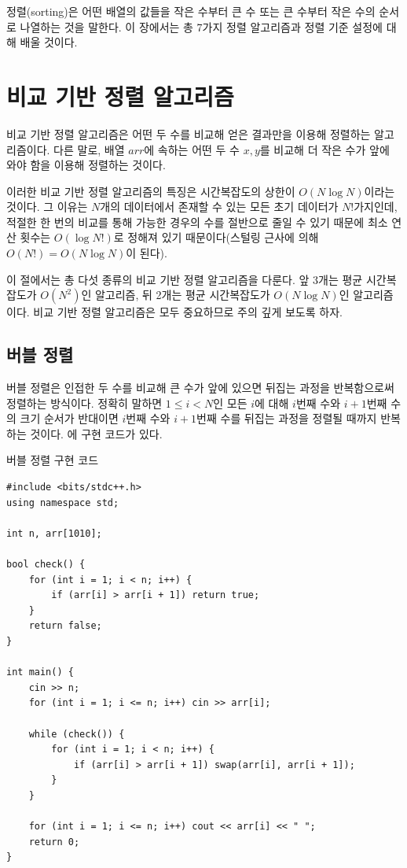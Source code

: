 정렬(sorting)은 어떤 배열의 값들을 작은 수부터 큰 수 또는 큰 수부터 작은 수의 순서로 나열하는 것을 말한다. 이 장에서는 총 7가지 정렬 알고리즘과 정렬 기준 설정에 대해 배울 것이다.

\section{비교 기반 정렬 알고리즘}
비교 기반 정렬 알고리즘은 어떤 두 수를 비교해 얻은 결과만을 이용해 정렬하는 알고리즘이다. 다른 말로, 배열 $arr$에 속하는 어떤 두 수 $x, y$를 비교해 더 작은 수가 앞에 와야 함을 이용해 정렬하는 것이다.

이러한 비교 기반 정렬 알고리즘의 특징은 시간복잡도의 상한이 $O(N \log N)$이라는 것이다. 그 이유는 $N$개의 데이터에서 존재할 수 있는 모든 초기 데이터가 $N!$가지인데, 적절한 한 번의 비교를 통해 가능한 경우의 수를 절반으로 줄일 수 있기 때문에 최소 연산 횟수는 $O(\log N!)$로 정해져 있기 때문이다(스털링 근사에 의해 $O(N!)=O(N \log N)$이 된다). 

이 절에서는 총 다섯 종류의 비교 기반 정렬 알고리즘을 다룬다. 앞 3개는 평균 시간복잡도가 $O(N^2)$인 알고리즘, 뒤 2개는 평균 시간복잡도가 $O(N \log N)$인 알고리즘이다. 비교 기반 정렬 알고리즘은 모두 중요하므로 주의 깊게 보도록 하자.

\subsection{버블 정렬}
버블 정렬은 인접한 두 수를 비교해 큰 수가 앞에 있으면 뒤집는 과정을 반복함으로써 정렬하는 방식이다. 정확히 말하면 $1 \leq i < N$인 모든 $i$에 대해 $i$번째 수와 $i+1$번째 수의 크기 순서가 반대이면 $i$번째 수와 $i+1$번째 수를 뒤집는 과정을 정렬될 때까지 반복하는 것이다. 에 구현 코드가 있다.

\begin{code} \label{code: bubble}
버블 정렬 구현 코드
\begin{lstlisting}
#include <bits/stdc++.h>
using namespace std;

int n, arr[1010];

bool check() {
    for (int i = 1; i < n; i++) {
        if (arr[i] > arr[i + 1]) return true;
    }
    return false;
}

int main() {
    cin >> n;
    for (int i = 1; i <= n; i++) cin >> arr[i];

    while (check()) {
        for (int i = 1; i < n; i++) {
            if (arr[i] > arr[i + 1]) swap(arr[i], arr[i + 1]);
        }
    }

    for (int i = 1; i <= n; i++) cout << arr[i] << " ";
    return 0;
}
\end{lstlisting}
\end{code}

